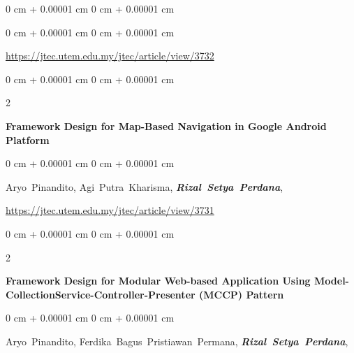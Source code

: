 \documentclass[10pt, letterpaper]{article}
\newenvironment{onecolentry}{
    \begin{adjustwidth}{
        0 cm + 0.00001 cm
    }{
        0 cm + 0.00001 cm
    }
}{
    \end{adjustwidth}
} %
\newenvironment{twocolentry}[2][]{
    \onecolentry
    \def\secondColumn{#2}
    \setcolumnwidth{\fill, 4.5 cm}
    \begin{paracol}{2}
}{
    \switchcolumn \raggedleft \secondColumn
    \end{paracol}
    \endonecolentry
} %
\begin{document}
\begin{onecolentry}
\begin{samepage}
\begin{onecolentry}
                 
                \vspace{0.10 cm}
                \href{https://jtec.utem.edu.my/jtec/article/view/3732}{https://jtec.utem.edu.my/jtec/article/view/3732}
            \end{onecolentry}
        \end{samepage}

        \vspace{0.3 cm}
        \begin{samepage}
            \begin{twocolentry}{2018}
                \textbf{Framework Design for Map-Based Navigation in Google Android Platform}
            \end{twocolentry}
            \vspace{0.10 cm}
            \begin{onecolentry}
                \mbox{Aryo Pinandito},
                \mbox{Agi Putra Kharisma},
                \mbox{\textbf{\textit{Rizal Setya Perdana}}}, 
                 
                \vspace{0.10 cm}
                \href{https://jtec.utem.edu.my/jtec/article/view/3731}{https://jtec.utem.edu.my/jtec/article/view/3731}
            \end{onecolentry}
        \end{samepage}
        
        \vspace{0.3 cm}
        \begin{samepage}
            \begin{twocolentry}{2017}
                \textbf{Framework Design for Modular Web-based Application Using Model-CollectionService-Controller-Presenter (MCCP) Pattern}
            \end{twocolentry}
            \vspace{0.10 cm}
            \begin{onecolentry}
                \mbox{Aryo Pinandito},
                \mbox{Ferdika Bagus Pristiawan Permana},
                \mbox{\textbf{\textit{Rizal Setya Perdana}}}, 
                 

\end{onecolentry}
\end{samepage}
\end{onecolentry}
\end{document}

